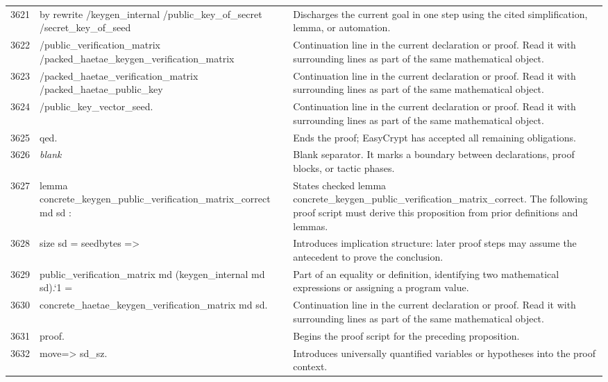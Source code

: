 \documentclass[10pt]{article}
\begin{document}
\begin{longtable}{r L{0.53\textwidth} L{0.37\textwidth}}
3621 & {\ttfamily\scriptsize by rewrite /keygen\_internal /public\_key\_of\_secret /secret\_key\_of\_seed} & Discharges the current goal in one step using the cited simplification, lemma, or automation. \\
3622 & {\ttfamily\scriptsize            /public\_verification\_matrix /packed\_haetae\_keygen\_verification\_matrix} & Continuation line in the current declaration or proof.  Read it with surrounding lines as part of the same mathematical object. \\
3623 & {\ttfamily\scriptsize            /packed\_haetae\_verification\_matrix /packed\_haetae\_public\_key} & Continuation line in the current declaration or proof.  Read it with surrounding lines as part of the same mathematical object. \\
3624 & {\ttfamily\scriptsize            /public\_key\_vector\_seed.} & Continuation line in the current declaration or proof.  Read it with surrounding lines as part of the same mathematical object. \\
3625 & {\ttfamily\scriptsize qed.} & Ends the proof; EasyCrypt has accepted all remaining obligations. \\
3626 & {\ttfamily\scriptsize \emph{blank}} & Blank separator.  It marks a boundary between declarations, proof blocks, or tactic phases. \\
3627 & {\ttfamily\scriptsize lemma concrete\_keygen\_public\_verification\_matrix\_correct md sd :} & States checked lemma concrete\_keygen\_public\_verification\_matrix\_correct.  The following proof script must derive this proposition from prior definitions and lemmas. \\
3628 & {\ttfamily\scriptsize   size sd = seedbytes =>} & Introduces implication structure: later proof steps may assume the antecedent to prove the conclusion. \\
3629 & {\ttfamily\scriptsize   public\_verification\_matrix md (keygen\_internal md sd).`1 =} & Part of an equality or definition, identifying two mathematical expressions or assigning a program value. \\
3630 & {\ttfamily\scriptsize   concrete\_haetae\_keygen\_verification\_matrix md sd.} & Continuation line in the current declaration or proof.  Read it with surrounding lines as part of the same mathematical object. \\
3631 & {\ttfamily\scriptsize proof.} & Begins the proof script for the preceding proposition. \\
3632 & {\ttfamily\scriptsize move=> sd\_sz.} & Introduces universally quantified variables or hypotheses into the proof context. \\

\end{longtable}
\end{document}
